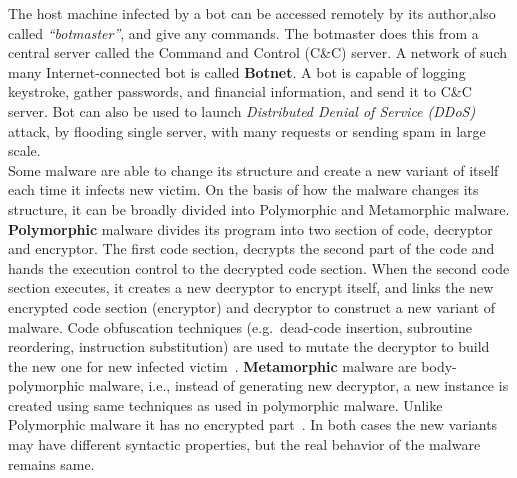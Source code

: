 The host machine infected by a bot can be accessed remotely by its author,also called \emph{``botmaster''}, and give any commands.
The botmaster does this from a central server called the Command and Control (C\&C) server.
A network of such many Internet-connected bot is called \textbf{Botnet}.
A bot is capable of logging keystroke, gather passwords, and financial information, and send it to C\&C server.
Bot can also be used to launch \emph{Distributed Denial of Service (DDoS)} attack, by flooding single server, with many requests or sending spam in large scale.\\
Some malware are able to change its structure and create a new variant of itself each time it infects new victim.
On the basis of how the malware changes its structure, it can be broadly divided into Polymorphic and Metamorphic malware.
\textbf{Polymorphic} malware divides its program into two section of code, decryptor and encryptor.
The first code section, decrypts the second part of the code and hands the execution control to the decrypted code section.
When the second code section executes, it creates a new decryptor to encrypt itself, and links the new encrypted code section (encryptor) and decryptor to construct a new variant of malware.
Code obfuscation techniques (e.g.\ dead-code insertion, subroutine reordering, instruction substitution) are used to mutate the decryptor to build the new one for new infected victim~\cite[]{rad2011evolution}.
\textbf{Metamorphic} malware are body-polymorphic malware, i.e., instead of generating new decryptor, a new instance is created using same techniques as used in polymorphic malware.
Unlike Polymorphic malware it has no encrypted part~\cite[]{rad2012camouflage}.
In both cases the new variants may have different syntactic properties, but the real behavior of the malware remains same.\\

